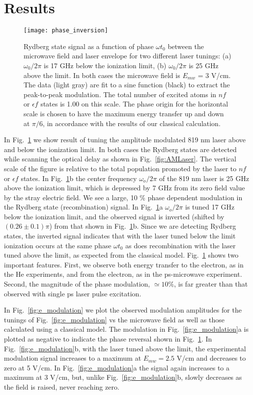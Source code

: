 \documentclass[pra, reprint]{revtex4-1}
\begin{document}
\section{Results}
\label{sec:results}

\begin{figure}[h]
  \texttt{[image: phase\_inversion]}
  \caption{Rydberg state signal as a function of phase $\omega t_0$ between the microwave field and laser envelope for two different laser tunings: (a) $\omega_0/2\pi$ is 17 GHz below the ionization limit, (b) $\omega_0/2\pi$ is 25 GHz above the limit. In both cases the microwave field is $E_{mw}$ = 3 V/cm. The data (light gray) are fit to a sine function (black) to extract the peak-to-peak modulation. The total number of excited atoms  in $nf$ or $\epsilon f$ states is 1.00 on this scale. The phase origin for the horizontal scale is chosen to have the maximum energy transfer up and down at $\pi/6 $, in accordance with the results of our classical calculation.}
  \label{fig:e_signal}
\end{figure}
In Fig.~\ref{fig:e_signal} we show result of tuning the amplitude modulated 819 nm laser above and below the ionization limit. In both cases the Rydberg states are detected while scanning the optical delay as shown in Fig.~\ref{fig:AMLaser}. The vertical scale of the figure is relative to the total population promoted by the laser to $nf$ or $\epsilon f$ states.  In Fig.~\ref{fig:e_signal}b the center frequency $\omega_o/2\pi$ of the 819 nm laser is 25 GHz above the ionization limit, which is depressed by 7 GHz from its zero field value by the stray electric field. We see a large, 10 \% phase dependent modulation in the Rydberg state (recombination) signal. In Fig.~\ref{fig:e_signal}a $\omega_o/2\pi$ is tuned 17 GHz below the ionization limit, and the observed signal is inverted (shifted by $(0.26 \pm 0.1) \pi$) from that shown in Fig.~\ref{fig:e_signal}b. Since we are detecting Rydberg states, the inverted signal indicates that with the laser tuned below the limit ionization occurs at the same phase $\omega t_0$ as does recombination with the laser tuned above the limit, as expected from the classical model. Fig.~\ref{fig:e_signal} shows two important features. First, we observe both energy transfer to the electron, as in the He experiments, and from the electron, as in the ps-microwave experiment. Second, the magnitude of the phase modulation, $\simeq 10\%$,  is far greater than that observed with single ps laser pulse excitation.

In Fig.~\ref{fig:e_modulation} we plot the observed modulation amplitudes for the tunings of Fig.~\ref{fig:e_modulation} vs the microwave field as well as those calculated using a classical  model. The modulation in Fig.~\ref{fig:e_modulation}a is plotted as negative to indicate the phase reversal shown in Fig.~\ref{fig:e_signal}. In Fig.~\ref{fig:e_modulation}b, with the laser tuned above the limit, the experimental modulation signal increases to a maximum at $E_{mw}=2.5$ V/cm and decreases to zero at 5 V/cm. In Fig.~\ref{fig:e_modulation}a the signal again increases to a maximum at 3 V/cm, but, unlike Fig.~\ref{fig:e_modulation}b, slowly decreases as the field is raised, never reaching zero.
\end{document}
